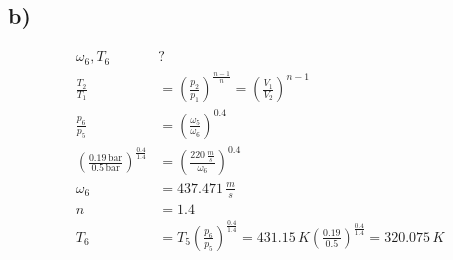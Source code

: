 

\subsection*{b)}
\begin{align*}
\omega_6, T_6 &? \\
\frac{T_2}{T_1} &= \left( \frac{p_2}{p_1} \right)^{\frac{n-1}{n}} = \left( \frac{V_1}{V_2} \right)^{n-1} \\
\frac{p_6}{p_5} &= \left( \frac{\omega_5}{\omega_6} \right)^{0.4} \\
\left( \frac{0.19 \, \text{bar}}{0.5 \, \text{bar}} \right)^{\frac{0.4}{1.4}} &= \left( \frac{220 \, \frac{m}{s}}{\omega_6} \right)^{0.4} \\
\omega_6 &= 437.471 \, \frac{m}{s} \\
n &= 1.4 \\
T_6 &= T_5 \left( \frac{p_6}{p_5} \right)^{\frac{0.4}{1.4}} = 431.15 \, K \left( \frac{0.19}{0.5} \right)^{\frac{0.4}{1.4}} = 320.075 \, K
\end{align*}